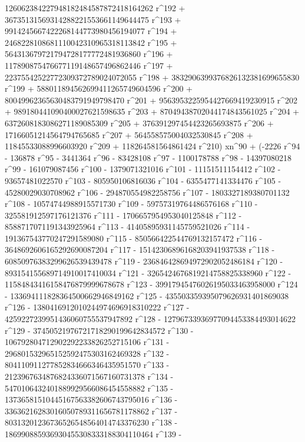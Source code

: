        126062384227948182484587872418164262 r^192 + 
       36735131569314288221553661149644475 r^193 + 
       9914245667422268144773980456194077 r^194 + 
       2468228108681110042310965318113842 r^195 + 
       564313679721794728177772481936860 r^196 + 
       117890875476677119148657496862446 r^197 + 
       22375542522772309372789024072055 r^198 + 
       3832906399376826132381699655830 r^199 + 
       588011894562699411265749604596 r^200 + 
       80049962365630483791949798470 r^201 + 
       9563953225954427669419230915 r^202 + 
       989180441090400027621598635 r^203 + 
       87049438702044174843561025 r^204 + 
       6372608183086271189085309 r^205 + 
       376391297454423265693875 r^206 + 
       17166051214564794765685 r^207 + 564558575004032530845 r^208 + 
       11845533088996603920 r^209 + 
       118264581564861424 r^210) xn^90 + (-2226 r^94 - 136878 r^95 - 
       3441364 r^96 - 83428108 r^97 - 1100178788 r^98 - 
       14397080218 r^99 - 161079087456 r^100 - 1379071321016 r^101 - 
       11151511154412 r^102 - 93657481022570 r^103 - 
       805950106816036 r^104 - 6355477141334476 r^105 - 
       45280029030708962 r^106 - 294870554982258756 r^107 - 
       1803327189380701132 r^108 - 10574744988915571730 r^109 - 
       59757319764486576168 r^110 - 325581912597176121376 r^111 - 
       1706657954953040125848 r^112 - 8588717071191343925964 r^113 - 
       41405895931145759521026 r^114 - 
       191367543770247291589080 r^115 - 
       850566422544769132157472 r^116 - 
       3648692606165292690087204 r^117 - 
       15142306896168203941937538 r^118 - 
       60850976383299626539439478 r^119 - 
       236846428694972902052486184 r^120 - 
       893154155689714910017410034 r^121 - 
       3265424676819214758825338960 r^122 - 
       11584843416158476879999678678 r^123 - 
       39917945476026195033463958000 r^124 - 
       133694111828364500662946849162 r^125 - 
       435503359395079626931401869038 r^126 - 
       1380416912010244974696918310222 r^127 - 
       4259227239951436060755537947892 r^128 - 
       12796733936977094453384493014622 r^129 - 
       37450521976721718290199642834572 r^130 - 
       106792804712902292233826252715106 r^131 - 
       296801532965152592475303162469328 r^132 - 
       804110911277852834666346435951570 r^133 - 
       2123967634876824336071567160731378 r^134 - 
       5470106432401889929566086454558882 r^135 - 
       13736581510445167563382606743795016 r^136 - 
       33636216283016050789311656781178862 r^137 - 
       80313201236736526548564014743376230 r^138 - 
       186990885936930455308333188304110464 r^139 - 
